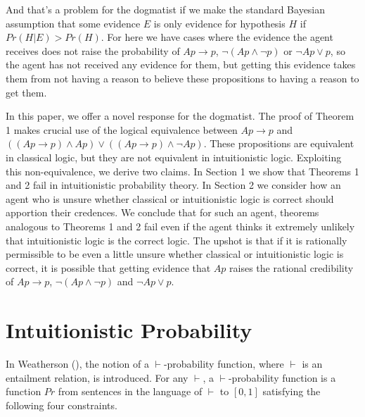 \documentclass[
  11pt,
  letterpaper,
  DIV=11,
  numbers=noendperiod,
  oneside]{scrartcl}
\begin{document}
And that's a problem for the dogmatist if we make the standard Bayesian
assumption that some evidence \(E\) is only evidence for hypothesis
\(H\) if \(Pr(H | E) > Pr(H)\). For here we have cases where the
evidence the agent receives does not raise the probability of
\(Ap \rightarrow p\), \(\neg(Ap \wedge \neg p)\) or \(\neg Ap \vee p\),
so the agent has not received any evidence for them, but getting this
evidence takes them from not having a reason to believe these
propositions to having a reason to get them.

In this paper, we offer a novel response for the dogmatist. The proof of
Theorem 1 makes crucial use of the logical equivalence between
\(Ap \rightarrow p\) and
\(((Ap \rightarrow p) \wedge Ap) \vee ((Ap \rightarrow p) \wedge \neg Ap)\).
These propositions are equivalent in classical logic, but they are not
equivalent in intuitionistic logic. Exploiting this non-equivalence, we
derive two claims. In Section 1 we show that Theorems 1 and 2 fail in
intuitionistic probability theory. In Section 2 we consider how an agent
who is unsure whether classical or intuitionistic logic is correct
should apportion their credences. We conclude that for such an agent,
theorems analogous to Theorems 1 and 2 fail even if the agent thinks it
extremely unlikely that intuitionistic logic is the correct logic. The
upshot is that if it is rationally permissible to be even a little
unsure whether classical or intuitionistic logic is correct, it is
possible that getting evidence that \(Ap\) raises the rational
credibility of \(Ap \rightarrow p\), \(\neg(Ap \wedge \neg p)\) and
\(\neg Ap \vee p\).

\section{Intuitionistic Probability}\label{intuitionistic-probability}

In Weatherson (), the notion of a
\(\vdash\)-probability function, where \(\vdash\) is an entailment
relation, is introduced. For any \(\vdash\), a \(\vdash\)-probability
function is a function \(Pr\) from sentences in the language of
\(\vdash\) to \([0, 1]\) satisfying the following four
constraints.
\end{document}

